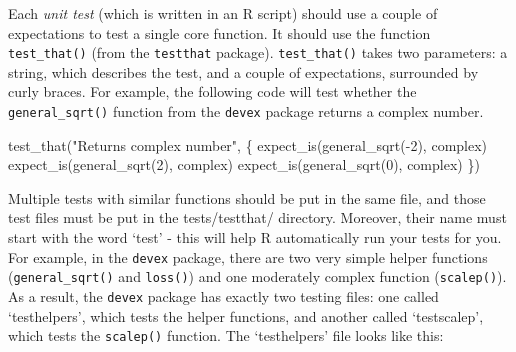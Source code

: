 \documentclass[
]{book}
\newenvironment{Shaded}{\begin{snugshade}}{\end{snugshade}}
\newcommand{\DecValTok}[1]{\textcolor[rgb]{0.00,0.00,0.81}{#1}}
\newcommand{\FunctionTok}[1]{\textcolor[rgb]{0.00,0.00,0.00}{#1}}
\newcommand{\NormalTok}[1]{#1}
\newcommand{\SpecialCharTok}[1]{\textcolor[rgb]{0.00,0.00,0.00}{#1}}
\newcommand{\StringTok}[1]{\textcolor[rgb]{0.31,0.60,0.02}{#1}}
\begin{document}
Each \emph{unit test} (which is written in an R script) should use a couple of expectations to test a single core function. It should use the function \texttt{test\_that()} (from the \texttt{testthat} package). \texttt{test\_that()} takes two parameters: a string, which describes the test, and a couple of expectations, surrounded by curly braces. For example, the following code will test whether the \texttt{general\_sqrt()} function from the \texttt{devex} package returns a complex number.

\begin{Shaded}
\begin{Highlighting}[]
\FunctionTok{test\_that}\NormalTok{(}\StringTok{"Returns complex number"}\NormalTok{, \{}
  \FunctionTok{expect\_is}\NormalTok{(}\FunctionTok{general\_sqrt}\NormalTok{(}\SpecialCharTok{{-}}\DecValTok{2}\NormalTok{), }\StringTok{\textquotesingle{}complex\textquotesingle{}}\NormalTok{)}
  \FunctionTok{expect\_is}\NormalTok{(}\FunctionTok{general\_sqrt}\NormalTok{(}\DecValTok{2}\NormalTok{), }\StringTok{\textquotesingle{}complex\textquotesingle{}}\NormalTok{)}
  \FunctionTok{expect\_is}\NormalTok{(}\FunctionTok{general\_sqrt}\NormalTok{(}\DecValTok{0}\NormalTok{), }\StringTok{\textquotesingle{}complex\textquotesingle{}}\NormalTok{)}
\NormalTok{\})}
\end{Highlighting}
\end{Shaded}

Multiple tests with similar functions should be put in the same file, and those test files must be put in the tests/testthat/ directory. Moreover, their name must start with the word `test' - this will help R automatically run your tests for you. For example, in the \texttt{devex} package, there are two very simple helper functions (\texttt{general\_sqrt()} and \texttt{loss()}) and one moderately complex function (\texttt{scalep()}). As a result, the \texttt{devex} package has exactly two testing files: one called `testhelpers', which tests the helper functions, and another called `testscalep', which tests the \texttt{scalep()} function. The `testhelpers' file looks like this:
\end{document}
